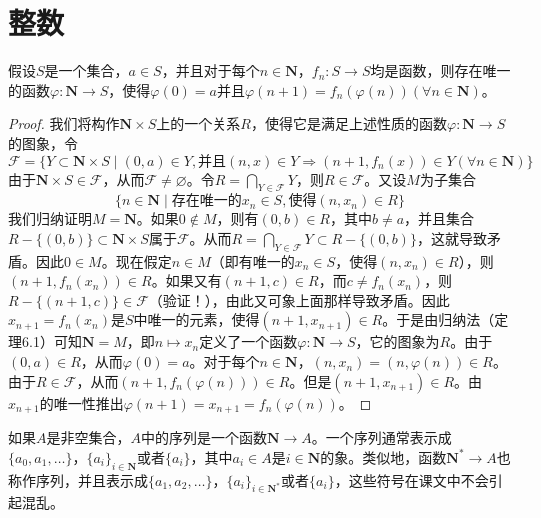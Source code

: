\documentclass[../../main.tex]{subfiles}
\begin{document}
\section{整数}

\begin{theorem}[逆归定理]\label{theorem:逆归定理}
假设$S$是一个集合，$a \in S$，并且对于每个$n \in \boldsymbol{N}$，$f_n: S \to S$均是函数，则存在唯一的函数$\varphi: \boldsymbol{N} \to S$，使得$\varphi(0) = a$并且$\varphi(n + 1) = f_n(\varphi(n)) (\forall n \in \boldsymbol{N})$。
\end{theorem}
\begin{proof}
我们将构作$\boldsymbol{N} \times S$上的一个关系$R$，使得它是满足上述性质的函数$\varphi: \boldsymbol{N} \to S$的图象，令
\[
\mathcal{F} = \{ Y \subset \boldsymbol{N} \times S \mid (0, a) \in Y, \text{并且} (n, x) \in Y \Rightarrow (n + 1, f_n(x)) \in Y (\forall n \in \boldsymbol{N}) \}
\]
由于$\boldsymbol{N} \times S \in \mathcal{F}$，从而$\mathcal{F} \neq \varnothing$。令$R = \bigcap_{Y \in \mathcal{F}} Y$，则$R \in \mathcal{F}$。又设$M$为子集合
\[
\{ n \in \boldsymbol{N} \mid \text{存在唯一的} x_n \in S, \text{使得} (n, x_n) \in R \}
\]
我们归纳证明$M = \boldsymbol{N}$。如果$0 \notin M$，则有$(0, b) \in R$，其中$b \neq a$，并且集合$R - \{ (0, b) \} \subset \boldsymbol{N} \times S$属于$\mathcal{F}$。从而$R = \bigcap_{Y \in \mathcal{F}} Y \subset R - \{ (0, b) \}$，这就导致矛盾。因此$0 \in M$。现在假定$n \in M$（即有唯一的$x_n \in S$，使得$(n, x_n) \in R$），则$(n + 1, f_n(x_n)) \in R$。如果又有$(n + 1, c) \in R$，而$c \neq f_n(x_n)$，则$R - \{ (n + 1, c) \} \in \mathcal{F}$（验证！），由此又可象上面那样导致矛盾。因此$x_{n + 1} = f_n(x_n)$是$S$中唯一的元素，使得$(n + 1, x_{n + 1}) \in R$。于是由归纳法（定理6.1）可知$\boldsymbol{N} = M$，即$n \longmapsto x_n$定义了一个函数$\varphi: \boldsymbol{N} \to S$，它的图象为$R$。由于$(0, a) \in R$，从而$\varphi(0) = a$。对于每个$n \in \boldsymbol{N}$，$(n, x_n) = (n, \varphi(n)) \in R$。由于$R \in \mathcal{F}$，从而$(n + 1, f_n(\varphi(n))) \in R$。但是$(n + 1, x_{n + 1}) \in R$。由$x_{n + 1}$的唯一性推出$\varphi(n + 1) = x_{n + 1} = f_n(\varphi(n))$。
\end{proof}

\begin{remark}
如果$A$是非空集合，$A$中的序列是一个函数$\boldsymbol{N} \to A$。一个序列通常表示成$\{a_0, a_1, \dots\}$，$\{a_i\}_{i \in \boldsymbol{N}}$或者$\{a_i\}$，其中$a_i \in A$是$i \in \boldsymbol{N}$的象。类似地，函数$\boldsymbol{N}^* \to A$也称作序列，并且表示成$\{a_1, a_2, \dots\}$，$\{a_i\}_{i \in \boldsymbol{N}^*}$或者$\{a_i\}$，这些符号在课文中不会引起混乱。
\end{remark}
\end{document}

